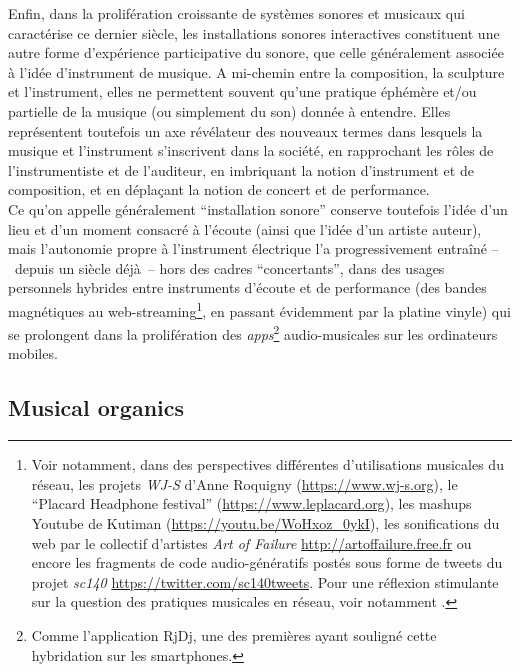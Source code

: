 \noindent Enfin, dans la prolifération croissante de systèmes sonores et musicaux qui caractérise ce dernier siècle, les installations sonores interactives constituent une autre forme d'expérience participative du sonore, que celle généralement associée à l'idée d'instrument de musique. A mi-chemin entre la composition, la sculpture et l'instrument, elles ne permettent souvent qu'une pratique éphémère et/ou partielle de la musique (ou simplement du son) donnée à entendre. Elles représentent toutefois un axe révélateur des nouveaux termes dans lesquels la musique et l'instrument s'inscrivent dans la société, en rapprochant les rôles de l'instrumentiste et de l'auditeur, en imbriquant la notion d'instrument et de composition, et en déplaçant la notion de concert et de performance.\\
\indent Ce qu'on appelle généralement ``installation sonore'' conserve toutefois l'idée d'un lieu et d'un moment consacré à l'écoute (ainsi que l'idée d'un artiste auteur), mais l'autonomie propre à l'instrument électrique l'a progressivement entraîné --~depuis un siècle déjà~-- hors des cadres ``concertants'', dans des usages personnels hybrides entre instruments d'écoute et de performance (des bandes magnétiques au web-streaming\footnote{Voir notamment, dans des perspectives différentes d'utilisations musicales du réseau, les projets \textit{WJ-S} d'Anne Roquigny (\url{https://www.wj-s.org}), le ``Placard Headphone festival'' (\url{https://www.leplacard.org}), les mashups Youtube de Kutiman (\url{https://youtu.be/WoHxoz_0ykI}), les sonifications du web par le collectif d'artistes \textit{Art of Failure} \url{http://artoffailure.free.fr} ou encore les fragments de code audio-génératifs postés sous forme de tweets du projet \textit{sc140} \url{https://twitter.com/sc140tweets}. Pour une réflexion stimulante sur la question des pratiques musicales en réseau, voir notamment \cite{joy_epoque_2009}.}, en passant évidemment par la platine vinyle) qui se prolongent dans la prolifération des \textit{apps}\footnote{Comme l'application RjDj, une des premières ayant souligné cette hybridation sur les smartphones.} audio-musicales sur les ordinateurs mobiles.
\subsection{Musical organics}
\label{sec:ephemerality:musical-organics}

